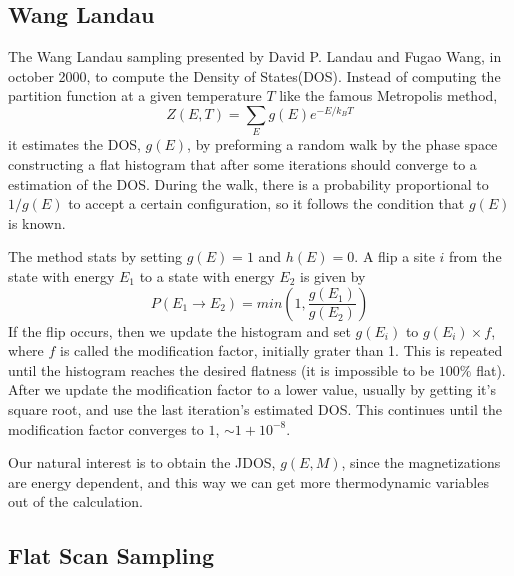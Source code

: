 \documentclass[a4paper, 11pt]{article}
\begin{document}
	\subsection{Wang Landau}
	
	The Wang Landau sampling \cite{WL_original} presented by David P. Landau and Fugao Wang, in october 2000, to compute the Density of States(DOS). Instead of computing the partition function at a given temperature $T$ like the famous Metropolis method\cite{metropolis}, 
	\begin{equation*}
		Z(E, T) = \sum_E g(E)e^{-E/k_BT}
	\end{equation*}
	it estimates the DOS, $g(E)$, by preforming a random walk by the phase space constructing a flat histogram that after some iterations should converge to a estimation of the DOS. During the walk, there is a probability proportional to $1/g(E)$ to accept a certain configuration, so it follows the condition that $g(E)$ is known.
	
	The method stats by setting $g(E)=1$ and $h(E)=0$. A flip a site $i$ from the state with energy $E_1$ to a state with energy $E_2$ is given by
	\begin{equation*}
		P(E_1\rightarrow E_2)=min\left(1, \frac{g(E_1)}{g(E_2)}\right)
	\end{equation*}
	If the flip occurs, then we update the histogram and set $g(E_i)$ to $g(E_i)\times f$, where $f$ is called the modification factor, initially grater than 1. This is repeated until the histogram reaches the desired flatness (it is impossible to be $100\%$ flat).
	After we update the modification factor to a lower value, usually by getting it's square root, and use the last iteration's estimated DOS. This continues until the modification factor converges to $1$, $\sim 1 + 10^{-8}$.

	Our natural interest is to obtain the JDOS\cite{JDOS_easy, JDOS_diff}, $g(E, M)$, since the magnetizations are energy dependent, and this way we can get more thermodynamic variables out of the calculation.
	
	\subsection{Flat Scan Sampling}
	
\end{document}
